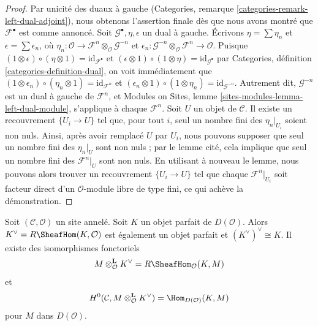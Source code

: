 \begin{proof}
Par unicité des duaux à gauche (Categories, remarque
\ref{categories-remark-left-dual-adjoint}), nous obtenons l'assertion finale
dès que nous avons montré que $\mathcal{F}^\bullet$ est comme annoncé. Soit
$\mathcal{G}^\bullet, \eta, \epsilon$ un dual à gauche. Écrivons
$\eta = \sum \eta_n$ et $\epsilon = \sum \epsilon_n$, où
$\eta_n : \mathcal{O} \to
\mathcal{F}^n \otimes_\mathcal{O} \mathcal{G}^{-n}$
et
$\epsilon_n : \mathcal{G}^{-n} \otimes_\mathcal{O} \mathcal{F}^n
\to \mathcal{O}$. Puisque
$(1 \otimes \epsilon) \circ (\eta \otimes 1) = \text{id}_{\mathcal{F}^\bullet}$
et
$(\epsilon \otimes 1) \circ (1 \otimes \eta) = \text{id}_{\mathcal{G}^\bullet}$
par Categories, définition \ref{categories-definition-dual}, on voit
immédiatement que
$(1 \otimes \epsilon_n) \circ (\eta_n \otimes 1) = \text{id}_{\mathcal{F}^n}$
et
$(\epsilon_n \otimes 1) \circ (1 \otimes \eta_n) =
\text{id}_{\mathcal{G}^{-n}}$.
Autrement dit, $\mathcal{G}^{-n}$ est un dual à gauche de
$\mathcal{F}^n$, et Modules on Sites, lemme
\ref{sites-modules-lemma-left-dual-module}, s'applique à chaque
$\mathcal{F}^n$. Soit $U$ un objet de $\mathcal{C}$. Il existe un recouvrement
$\{U_i \to U\}$ tel que, pour tout $i$, seul un nombre fini des
$\eta_n|_{U_i}$ soient non nuls. Ainsi, après avoir remplacé $U$ par $U_i$,
nous pouvons supposer que seul un nombre fini des $\eta_n|_U$ sont non nuls ;
par le lemme cité, cela implique que seul un nombre fini des
$\mathcal{F}^n|_U$ sont non nuls. En utilisant à nouveau le lemme, nous
pouvons alors trouver un recouvrement $\{U_i \to U\}$ tel que chaque
$\mathcal{F}^n|_{U_i}$ soit facteur direct d'un $\mathcal{O}$-module libre de
type fini, ce qui achève la démonstration.
\end{proof}

\begin{lemma}
\label{lemma-dual-perfect-complex}
Soit $(\mathcal{C}, \mathcal{O})$ un site annelé. Soit $K$ un objet parfait
de $D(\mathcal{O})$. Alors $K^\vee = R\SheafHom(K, \mathcal{O})$ est également
un objet parfait et $(K^\vee)^\vee \cong K$. Il existe des isomorphismes
fonctoriels
$$
M \otimes^\mathbf{L}_\mathcal{O} K^\vee = R\SheafHom_\mathcal{O}(K, M)
$$
et
$$
H^0(\mathcal{C}, M \otimes^\mathbf{L}_\mathcal{O} K^\vee) =
\Hom_{D(\mathcal{O})}(K, M)
$$
pour $M$ dans $D(\mathcal{O})$.
\end{lemma}

